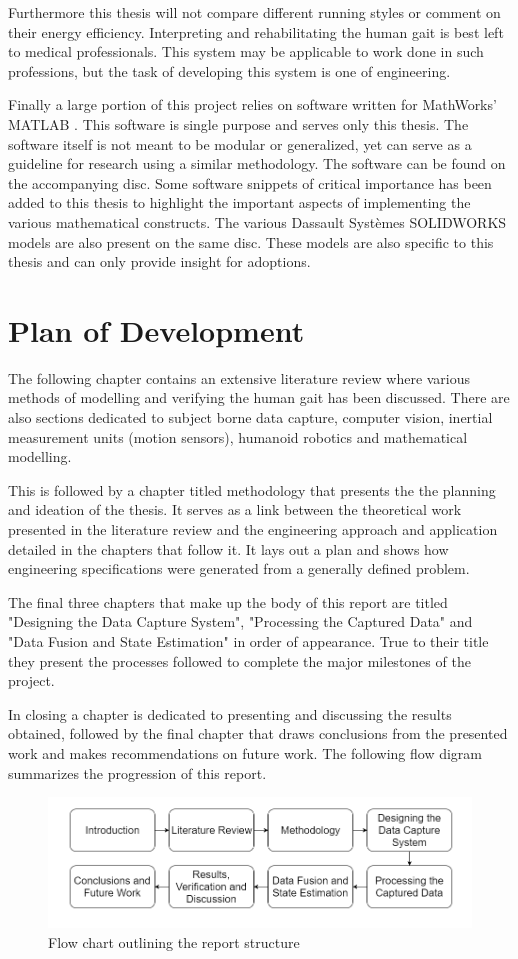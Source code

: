 Furthermore this thesis will not compare different running styles or comment on their energy efficiency. Interpreting and rehabilitating the human gait is best left to medical professionals. This system may be applicable to work done in such professions, but the task of developing this system is one of engineering.

Finally a large portion of this project relies on software written for MathWorks' MATLAB \cite{matlab}. This software is single purpose and serves only this thesis. The software itself is not meant to be modular or generalized, yet can serve as a guideline for research using a similar methodology. The software can be found on the accompanying disc. Some software snippets of critical importance has been added to this thesis to highlight the important aspects of implementing the various mathematical constructs. The various Dassault Systèmes SOLIDWORKS \cite{solidworks} models are also present on the same disc. These models are also specific to this thesis and can only provide insight for adoptions. 

\section{Plan of Development}
The following chapter contains an extensive literature review where various methods of modelling and verifying the human gait has been discussed. There are also sections dedicated to subject borne data capture, computer vision, inertial measurement units (motion sensors), humanoid robotics and mathematical modelling.

This is followed by a chapter titled methodology that presents the the planning and ideation of the thesis. It serves as a link between the theoretical work presented in the literature review and the engineering approach and application detailed in the chapters that follow it. It lays out a plan and shows how engineering specifications were generated from a generally defined problem. 

The final three chapters that make up the body of this report are titled "Designing the Data Capture System", "Processing the Captured Data" and "Data Fusion and State Estimation" in order of appearance. True to their title they present the processes followed to complete the major milestones of the project.

In closing a chapter is dedicated to presenting and discussing the results obtained, followed by the final chapter that draws conclusions from the presented work and makes recommendations on future work. The following flow digram summarizes the progression of this report.

\begin{figure}[!ht] 
\captionsetup{width=\linewidth, font=small}  
\includegraphics[width=\linewidth]{figures/introflow.png}
\caption{Flow chart outlining the report structure}
\label{fig:introflow}
\end{figure}
